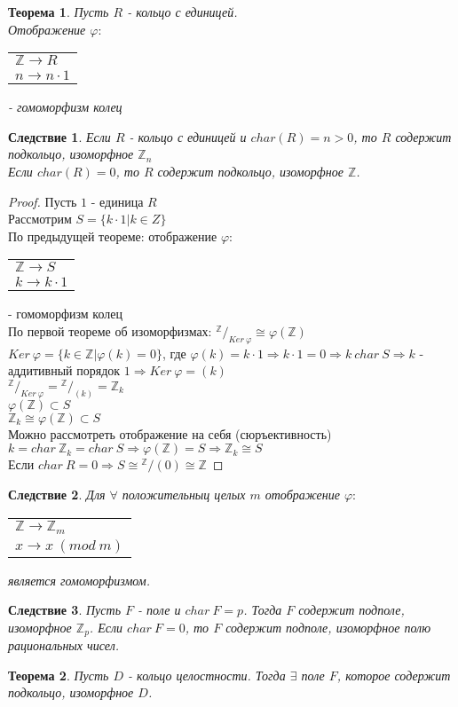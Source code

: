\documentclass[10pt,a4paper]{article}
\newtheorem{theorem}{Теорема}
\newtheorem{corollary}{Следствие}
\newcommand*{\Z}{\mathbb{Z}}
\begin{document}
				\begin{theorem}
					Пусть $R$ - кольцо с единицей.\\
					Отображение $\varphi:$
					\begin{tabular}{l}
						$\Z \to R$\\
						$n \to n \cdot 1$
					\end{tabular}
					- гомоморфизм колец
				\end{theorem}
				\begin{corollary}
					Если $R$ - кольцо с единицей и $char(R) = n > 0$, то $R$ содержит подкольцо, изоморфное $\Z_n$\\
					Если $char(R) = 0$, то $R$ содержит подкольцо, изоморфное $\Z$.
				\end{corollary}
				\begin{proof}
					Пусть $1$ - единица $R$\\
					Рассмотрим $S = \{k \cdot 1 \big| k \in Z\}$\\
					По предыдущей теореме: отображение $\varphi:$
					\begin{tabular}{l}
					$\Z \to S$\\
					$k \to k \cdot 1$
					\end{tabular}
					- гомоморфизм колец\\
					По первой теореме об изоморфизмах: ${}^{\Z}/_{Ker\ \varphi} \cong \varphi(\Z)$\\
					$Ker\ \varphi = \{k \in \Z \big| \varphi(k) = 0\}$, где $\varphi(k) = k \cdot 1 \Rightarrow k \cdot 1 = 0 \Rightarrow k \ char\ S \Rightarrow k$ - аддитивный порядок $1 \Rightarrow Ker\ \varphi = (k)$\\
					${}^{\Z}/_{Ker\ \varphi} = {}^{\Z}/_{(k)} = \Z_k$\\
					$\varphi(\Z) \subset S$\\
					$\Z_k \cong \varphi(\Z) \subset S$\\
					Можно рассмотреть отображение на себя (сюръективность)\\
					$k = char\ \Z_k = char\ S \Rightarrow \varphi(\Z) = S \Rightarrow \Z_k \cong S$\\
					Если $char\ R = 0 \Rightarrow S \cong {}^{\Z}/{(0)} \cong \Z$
				\end{proof}
				\begin{corollary}
					Для $\forall$ положительныц целых $m$ отображение $\varphi:$
					\begin{tabular}{l}
						$\Z \to \Z_m$\\
						$x \to x\ (mod\ m)$
					\end{tabular}
					является гомоморфизмом.
				\end{corollary}
				\begin{corollary}
					Пусть $F$ - поле и $char\ F = p$. Тогда $F$ содержит подполе, изоморфное $\Z_p$. Если $char\ F = 0$, то $F$ содержит подполе, изоморфное полю рациональных чисел.
				\end{corollary}
				\begin{theorem}
					Пусть $D$ - кольцо целостности. Тогда $\exists$ поле $F$, которое содержит подкольцо, изоморфное $D$.
				\end{theorem}
\end{document}
